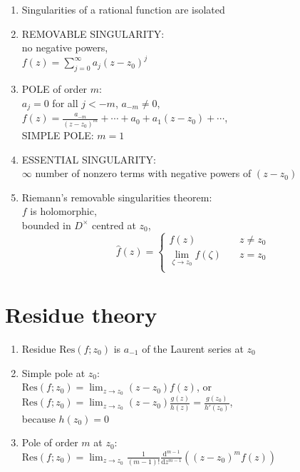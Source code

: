 \documentclass[11pt,a4paper]{article}
\begin{document}
\begin{multicols}{2}
\begin{enumerate}[resume]
\item Singularities of a rational function are isolated

\item REMOVABLE SINGULARITY: \\no negative powers, \\$f(z) = \sum_{j=0}^{\infty} a_j (z-z_0)^j$

\item POLE of order $m$: \\$a_j=0$ for all $j<-m$, $a_{-m} \neq 0$, \\$f(z) = \frac{a_{-m}}{(z-z_0)^m} + \cdots + a_0 + a_1 (z-z_0) + \cdots$, \\SIMPLE POLE: $m=1$

\item ESSENTIAL SINGULARITY: \\$\infty$ number of nonzero terms with negative powers of $(z-z_0)$

\item Riemann's removable singularities theorem: \\$f$ is holomorphic, \\bounded in $D^{\times}$ centred at $z_0$, \\
\[
\hat{f}(z) = 
\begin{cases}
f(z) &\quad z \neq z_0 \\
\lim_{\zeta \to z_0} f(\zeta) &\quad z = z_0 \\
\end{cases}
\]
\end{enumerate}

\section*{Residue theory}
\begin{enumerate}[resume]
\item Residue $\mathrm{Res}(f;z_0)$ is $a_{-1}$ of the Laurent series at $z_0$

\item Simple pole at $z_0$: \\$\mathrm{Res}(f;z_0) = \lim_{z \to z_0} (z-z_0) f(z)$, or \\$\mathrm{Res}(f;z_0) = \lim_{z \to z_0} (z-z_0) \frac{g(z)}{h(z)} = \frac{g(z_0)}{h'(z_0)}$, \\because $h(z_0)=0$

\item Pole of order $m$ at $z_0$: \\$\mathrm{Res}(f;z_0) = \displaystyle \lim_{z \to z_0} \frac{1}{(m-1)!} \frac{\mathrm{d}^{m-1}}{\mathrm{d}z^{m-1}} \left( (z-z_0)^m f(z) \right)$


\end{enumerate}
\end{multicols}
\end{document}
